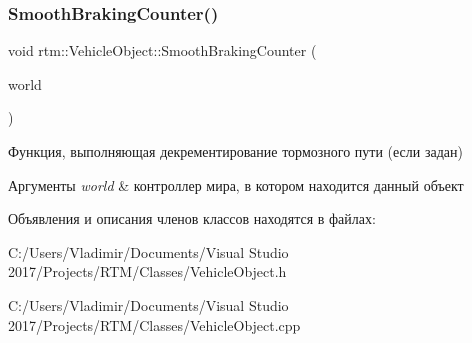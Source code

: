 \subsubsection{\texorpdfstring{Smooth\+Braking\+Counter()}{SmoothBrakingCounter()}}
{\footnotesize\ttfamily void rtm\+::\+Vehicle\+Object\+::\+Smooth\+Braking\+Counter (\begin{DoxyParamCaption}\item[{\hyperlink{classrtm_1_1_world_controller}{World\+Controller} $\ast$const}]{world }\end{DoxyParamCaption})\hspace{0.3cm}{\ttfamily [private]}}

Функция, выполняющая декрементирование тормозного пути (если задан) 
\begin{DoxyParams}{Аргументы}
{\em world} & контроллер мира, в котором находится данный объект \\
\hline
\end{DoxyParams}


Объявления и описания членов классов находятся в файлах\+:\begin{DoxyCompactItemize}
\item 
C\+:/\+Users/\+Vladimir/\+Documents/\+Visual Studio 2017/\+Projects/\+R\+T\+M/\+Classes/Vehicle\+Object.\+h\item 
C\+:/\+Users/\+Vladimir/\+Documents/\+Visual Studio 2017/\+Projects/\+R\+T\+M/\+Classes/Vehicle\+Object.\+cpp\end{DoxyCompactItemize}
